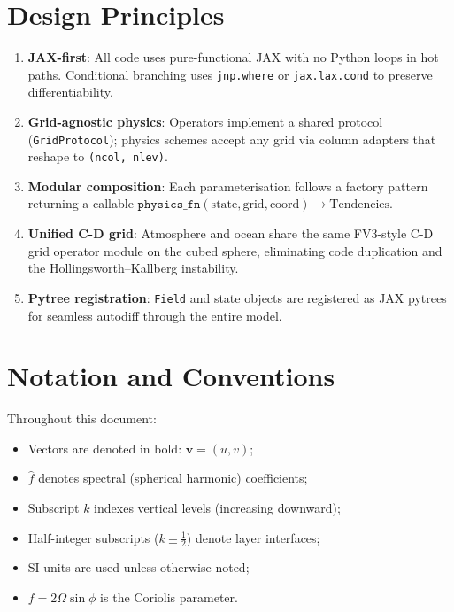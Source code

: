 \documentclass[11pt,twoside]{report}
\newcommand{\half}{\tfrac{1}{2}}
\newcommand{\vect}[1]{\bm{#1}}
\begin{document}
\section{Design Principles}

\begin{enumerate}[nosep]
  \item \textbf{JAX-first}: All code uses pure-functional JAX with no
    Python loops in hot paths.  Conditional branching uses
    \texttt{jnp.where} or \texttt{jax.lax.cond} to preserve
    differentiability.
  \item \textbf{Grid-agnostic physics}: Operators implement a shared
    protocol (\texttt{GridProtocol}); physics schemes accept any grid
    via column adapters that reshape to \texttt{(ncol, nlev)}.
  \item \textbf{Modular composition}: Each parameterisation follows a
    factory pattern returning a callable
    $\texttt{physics\_fn}(\text{state}, \text{grid}, \text{coord})
    \to \text{Tendencies}$.
  \item \textbf{Unified C-D grid}: Atmosphere and ocean share the same
    FV3-style C-D grid operator module on the cubed sphere, eliminating
    code duplication and the Hollingsworth--Kallberg instability.
  \item \textbf{Pytree registration}: \texttt{Field} and state objects
    are registered as JAX pytrees for seamless autodiff through the
    entire model.
\end{enumerate}

\section{Notation and Conventions}

Throughout this document:
\begin{itemize}[nosep]
  \item Vectors are denoted in bold: $\vect{v}=(u,v)$;
  \item $\hat{f}$ denotes spectral (spherical harmonic) coefficients;
  \item Subscript $k$ indexes vertical levels (increasing downward);
  \item Half-integer subscripts ($k\pm\half$) denote layer interfaces;
  \item SI units are used unless otherwise noted;
  \item $f = 2\Omega\sin\phi$ is the Coriolis parameter.
\end{itemize}
\end{document}
